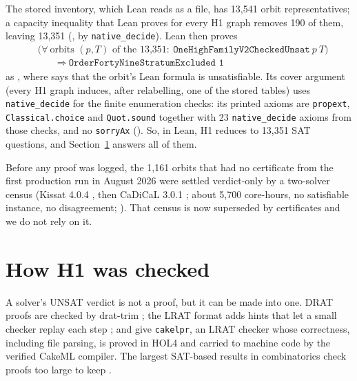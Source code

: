 \documentclass{anvil-paper}
\newcommand{\repobase}{https://github.com/rjwalters/lean-genius/blob/erdos85/integration}
\newcommand{\repofile}[2]{\href{\repobase/#1}{\lean{#2}}}
\newcommand{\rp}{research/problems/erdos-85-wip-01}
\newcommand{\cakelpr}{\texttt{cake\textunderscore lpr}}
\theoremstyle{definition}
\begin{document}
The stored inventory, which Lean reads as a file, has 13,541 orbit representatives; a capacity inequality that Lean proves for every H1 graph removes 190 of them, leaving 13,351 (, by \texttt{native\_decide}). Lean then proves
\[
\begin{aligned}
&\bigl(\forall\ \text{orbits } (p,T) \text{ of the 13,351}:\ \texttt{OneHighFamilyV2CheckedUnsat}\ p\ T\bigr)\\
&\qquad\Longrightarrow\ \texttt{OrderFortyNineStratumExcluded 1}
\end{aligned}
\]
as , where  says that the orbit's Lean formula is unsatisfiable. Its cover argument (every H1 graph induces, after relabelling, one of the stored tables) uses \texttt{native\_decide} for the finite enumeration checks: its printed axioms are \texttt{propext}, \texttt{Classical.choice} and \texttt{Quot.sound} together with 23 \texttt{native\_decide} axioms from those checks, and no \texttt{sorryAx} (\repofile{\rp/h1_cert_pilot_20261001/H1_COVER_AXIOMS_20261006.txt}{H1_COVER_AXIOMS_20261006.txt}). So, in Lean, H1 reduces to 13,351 SAT questions, and Section~\ref{sec:h1} answers all of them.

Before any proof was logged, the 1,161 orbits that had no certificate from the first production run in August 2026 were settled verdict-only by a two-solver census (Kissat 4.0.4 \citep{biere2024kissat}, then CaDiCaL 3.0.1 \citep{biere2020cadical,biere2024cadical2}; about 5,700 core-hours, no satisfiable instance, no disagreement; \repofile{\rp/phase_b_h1_census_20260927/CENSUS.md}{CENSUS.md}). That census is now superseded by certificates and we do not rely on it.

\section{How H1 was checked}\label{sec:h1}

A solver's UNSAT verdict is not a proof, but it can be made into one. DRAT proofs are checked by drat-trim \citep{wetzler2014drat}; the LRAT format adds hints that let a small checker replay each step \citep{cruzfilipe2017lrat}; and \citet{tan2021cakelpr} give \cakelpr{}, an LRAT checker whose correctness, including file parsing, is proved in HOL4 and carried to machine code by the verified CakeML compiler. The largest SAT-based results in combinatorics check proofs too large to keep \citep{heule2016pythagorean,heule2018schur}.
\end{document}

